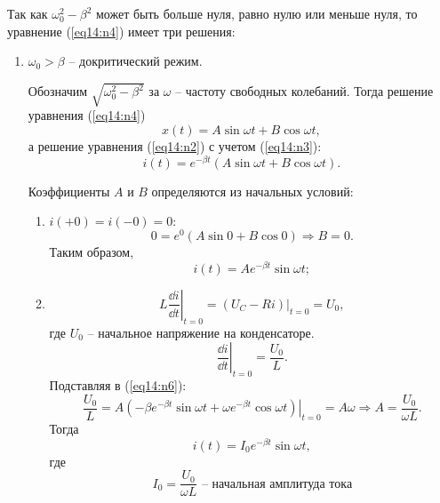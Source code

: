 	Так как \( \omega_0^2 - \beta^2 \) может быть больше нуля, равно нулю или
    меньше нуля, то уравнение (\ref{eq14:n4}) имеет три решения:
	\begin{enumerate}
        \item \( \omega_0 > \beta \) -- докритический режим.

            Обозначим \( \sqrt{\omega_0^2 - \beta^2} \) за \( \omega \) --
            частоту свободных колебаний. Тогда решение уравнения (\ref{eq14:n4})
            \[
                x(t) = A\sin\omega t + B\cos\omega t,
            \]
            а решение уравнения (\ref{eq14:n2}) с учетом (\ref{eq14:n3}):
            \begin{equation}
                i(t) = e^{-\beta t}(A\sin\omega t + B\cos\omega t).
                \label{eq14:n5}
            \end{equation}
        
            Коэффициенты \( A \) и \( B \)  определяются из начальных условий:
            \begin{enumerate}
                \item \( i(+0) = i(-0) = 0: \)
                \[
                    0 = e^0(A\sin0 + B\cos0) \Rightarrow B = 0.
                \]
                Таким образом,
                \begin{equation}
                    i(t) = Ae^{-\beta t}\sin\omega t;
                    \label{eq14:n6}
                \end{equation}
                
                \item
                    \[
                        L\left.\frac{\dd i}{\dd t}\right|_{t = 0} =
                        \left.(U_C - Ri)\right|_{t = 0} = U_0,
                    \]
                где \( U_0 \) -- начальное напряжение на конденсаторе.
                \[
                    \left.\frac{\dd i}{\dd t}\right|_{t = 0} = \frac{U_0}{L}.
                \]
                Подставляя в (\ref{eq14:n6}):
                \[
                    \frac{U_0}{L} = \left.A(-\beta e^{-\beta t}\sin\omega t +
                    \omega e^{-\beta t}\cos\omega t)\right|_{t = 0} =
                    A\omega \Rightarrow A = \frac{U_0}{\omega L}.
                \]
                Тогда
                \begin{equation}
                    i(t) = I_0e^{-\beta t}\sin\omega t,
                    \label{eq14:n7}
                \end{equation}
                где
                \[
                    I_0 = \frac{U_0}{\omega L}
                    \text{ -- начальная амплитуда тока}
                \]
            \end{enumerate}
        

\end{enumerate}
